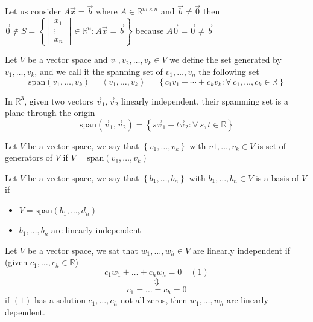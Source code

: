 Let us consider $A \vec x = \vec b$ where $A \in \mathbb{R}^{m \times n}$ and $\vec b \ne \vec 0$ then $\vec 0 \not \in S =\left\{ \begin{bmatrix}
    x_1\\
    \vdots\\
    x_n
\end{bmatrix} \in \mathbb{R}^n  : A \vec x = \vec b \right\}$ because $A \vec 0 = \vec 0 \ne \vec b$
\begin{definition}
    Let $V$ be a vector space and $v_1, v_2, \dots, v_k \in V$ we define the set generated by $v_1, \dots, v_k$, and we call it the spanning set of $v_1, \dots, v_n$ the following set
    $$\text{span}(v_1, \dots, v_k) = \left< v_1, \dots, v_k \right> = \left\{ c_1 v_1 + \cdots + c_k v_k : \forall \ c_1, \dots, c_k \in \mathbb{R} \right\}$$
\end{definition}
\begin{example}
    In $\mathbb{R}^3$, given two vectors $\vec v_1, \vec v_2$ linearly independent, their spamming set is a plane through the origin
    $$\text{span}(\vec v_1, \vec v_2) = \left\{ s\vec v_1 + t \vec v_2 : \forall \ s,t \in \mathbb{R} \right\}$$
\end{example}
\begin{definition}
    Let $V$ be a vector space, we say that $\left\{ v_1, \dots, v_k \right\}$ with $v1, \dots, v_k \in V$ is set of generators of $V$ if $V = \text{span}(v_1, \dots, v_k)$
\end{definition}
\begin{definition}
    Let $V$ be a vector space, we say that $\left\{ b_1, \dots, b_n \right\}$ with $b_1, \dots, b_n \in V$ is a basis of $V$ if
    \begin{itemize}
        \item $V = \text{span}(b_1, \dots, d_n)$
        \item $b_1, \dots, b_n$ are linearly independent
    \end{itemize}
\end{definition}
\begin{definition}
    Let $V$ be a vector space, we sat that $w_1, \dots, w_h \in V$ are linearly independent if (given $c_1, \dots, c_h \in \mathbb{R}$)
    $$c_1 w_1 + \dots + c_h w_h = 0 \quad (1)$$
    $$\Updownarrow$$
    $$c_1 = \dots = c_h = 0$$
    if $(1)$ has a solution $c_1, \dots, c_h$ not all zeros, then $w_1, \dots, w_h$ are linearly dependent.
\end{definition}